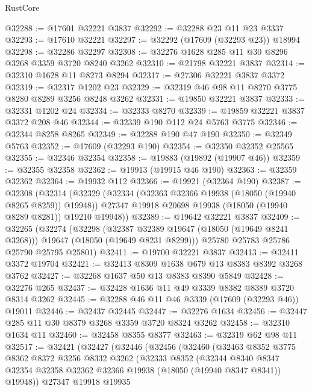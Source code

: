 \begin{lexlean}{RustCore}
\begin{coremodule}
@32288 := @17601 @32221 @3837
@32292 := @32288 @23 @11 @23 @3337
@32293 := @17610 @32221
@32297 := @32292 (@17609 (@32293 @23)) @18994
@32298 := @32286 @32297
@32308 := @32276 @1628 @285 @11 @30 @8296 @3268 @3359 @3720 @8240 @3262
@32310 := @21798 @32221 @3837
@32314 := @32310 @1628 @11 @8273 @8294
@32317 := @27306 @32221 @3837 @3372
@32319 := @32317 @1202 @23
@32329 := @32319 @46 @98 @11 @8270 @3775 @8280 @8289 @3256 @8248 @3262
@32331 := @19850 @32221 @3837
@32333 := @32331 @1202 @24
@32334 := @32333 @8270
@32339 := @19859 @32221 @3837 @3372 @208 @46
@32344 := @32339 @190 @112 @24 @5763 @3775
@32346 := @32344 @8258 @8265
@32349 := @32288 @190 @47 @190
@32350 := @32349 @5763
@32352 := @17609 (@32293 @190)
@32354 := @32350 @32352 @25565
@32355 := @32346 @32354
@32358 := @19883 (@19892 (@19907 @46))
@32359 := @32355 @32358
@32362 := @19913 (@19915 @46 @190)
@32363 := @32359 @32362
@32364 := @19932 @112
@32366 := @19921 (@32364 @190)
@32387 := @32308
    (@32314
      (@32329
        (@32334 (@32363 @32366 @19938 (@18050 (@19940 @8265 @8259)) @19948))
        @27347
        @19918
        @20698
        @19938
        (@18050 (@19940 @8289 @8281))
        @19210
        @19948))
@32389 := @19642 @32221 @3837
@32409 := @32265
    (@32274
      (@32298
        (@32387 @32389 @19647 (@18050 (@19649 @8241 @3268)))
        @19647
        (@18050 (@19649 @8231 @8299)))
      @25780
      @25783
      @25786
      @25790
      @25795
      @25801)
@32411 := @19700 @32221 @3837
@32413 := @32411 @3372 @19704
@32421 := @32413 @8309 @1638 @679 @13 @8383 @8392 @3268 @3762
@32427 := @32268 @1637 @50 @13 @8383 @8390 @5849
@32428 := @32276 @265
@32437 := @32428 @1636 @11 @49 @3339 @8382 @8389 @3720 @8314 @3262
@32445 := @32288 @46 @11 @46 @3339 (@17609 (@32293 @46)) @19011
@32446 := @32437 @32445
@32447 := @32276 @1634
@32456 := @32447 @285 @11 @30 @8379 @3268 @3359 @3720 @8324 @3262
@32458 := @32310 @1634 @11
@32460 := @32458 @8355 @8377
@32463 := @32319 @62 @98 @11
@32517 := @32421
    (@32427
      (@32446
        (@32456
          (@32460
            (@32463
              @8352
              @3775
              @8362
              @8372
              @3256
              @8332
              @3262
              (@32333
                @8352
                (@32344
                  @8340
                  @8347
                  @32354
                  @32358
                  @32362
                  @32366
                  @19938
                  (@18050 (@19940 @8347 @8341))
                  @19948))
              @27347
              @19918
              @19935

\end{coremodule}
\end{lexlean}
